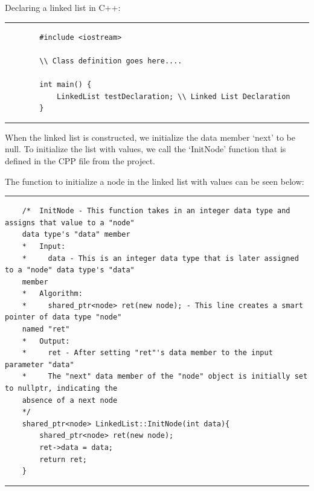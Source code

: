 \documentclass[a4paper,9pt]{article}
\newcommand{\horizontalline}{\noindent \rule{\textwidth}{0.5pt}\par}
\begin{document}
\begin{highlight}
    Declaring a linked list in C++:

    \horizontalline

    \begin{verbatim}
        #include <iostream>

        \\ Class definition goes here....

        int main() {
            LinkedList testDeclaration; \\ Linked List Declaration
        }
    \end{verbatim}

    \horizontalline
\end{highlight}

When the linked list is constructed, we initialize the data member `next' to be null. To initialize the list with values, we call
the `InitNode' function that is defined in the CPP file from the project.

\begin{highlight}
    The function to initialize a node in the linked list with values can be seen below:

    \horizontalline

    \begin{verbatim}
    /*  InitNode - This function takes in an integer data type and assigns that value to a "node" 
    data type's "data" member
    *   Input:
    *     data - This is an integer data type that is later assigned to a "node" data type's "data" 
    member
    *   Algorithm:
    *     shared_ptr<node> ret(new node); - This line creates a smart pointer of data type "node" 
    named "ret"
    *   Output:
    *     ret - After setting "ret"'s data member to the input parameter "data"
    *     The "next" data member of the "node" object is initially set to nullptr, indicating the 
    absence of a next node
    */
    shared_ptr<node> LinkedList::InitNode(int data){
        shared_ptr<node> ret(new node);
        ret->data = data;
        return ret;
    }
    \end{verbatim}

    \horizontalline
\end{highlight}
\end{document}
